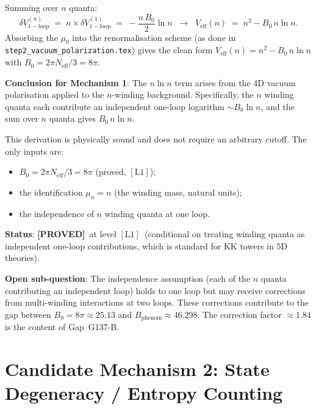 \documentclass[12pt,a4paper]{article}
\theoremstyle{definition}
\theoremstyle{remark}
\newcommand{\Neff}{N_{\mathrm{eff}}}
\newcommand{\PROVED}{\textcolor{green!60!black}{\textbf{[PROVED]}}}
\newcommand{\Lone}{$[\mathrm{L1}]$}
\begin{document}
Summing over $n$ quanta:
\begin{equation}
  \delta V_{\mathrm{1-loop}}^{(n)}
  \;=\;
  n \times \delta V_{\mathrm{1-loop}}^{(1)}
  \;=\;
  -\frac{n\,B_0}{2}\ln n
  \;\;\longrightarrow\;\;
  V_{\mathrm{eff}}(n)
  \;=\;
  n^2 - B_0\,n\ln n.
  \label{eq:nlogn:n_loops}
\end{equation}
Absorbing the $\mu_0$ into the renormalisation scheme (as done in
\texttt{step2\_vacuum\_polarization.tex}) gives the clean form
$V_\mathrm{eff}(n) = n^2 - B_0\,n\ln n$ with $B_0 = 2\pi\Neff/3 = 8\pi$.

\begin{resultbox}
\textbf{Conclusion for Mechanism 1}: The $n\ln n$ term arises from the 4D
vacuum polarisation applied to the $n$-winding background.  Specifically, the
$n$ winding quanta each contribute an independent one-loop logarithm
$\sim B_0\ln n$, and the sum over $n$ quanta gives $B_0\,n\ln n$.

This derivation is physically sound and does not require an arbitrary cutoff.
The only inputs are:
\begin{itemize}
  \item $B_0 = 2\pi\Neff/3 = 8\pi$ (proved, \Lone);
  \item the identification $\mu_n = n$ (the winding mass, natural units);
  \item the independence of $n$ winding quanta at one loop.
\end{itemize}
\textbf{Status}: \PROVED\ at level \Lone\ (conditional on treating winding
quanta as independent one-loop contributions, which is standard for KK towers
in 5D theories).
\end{resultbox}

\begin{gapbox}
\textbf{Open sub-question}: The independence assumption (each of the $n$
quanta contributing an independent loop) holds to one loop but may receive
corrections from multi-winding interactions at two loops.  These corrections
contribute to the gap between $B_0 = 8\pi \approx 25.13$ and
$B_\mathrm{phenom} \approx 46.298$.  The correction factor $\approx 1.84$ is
the content of Gap~G137-B.
\end{gapbox}

\section{Candidate Mechanism 2: State Degeneracy / Entropy Counting}
\label{sec:nlogn:entropy}
\end{document}
